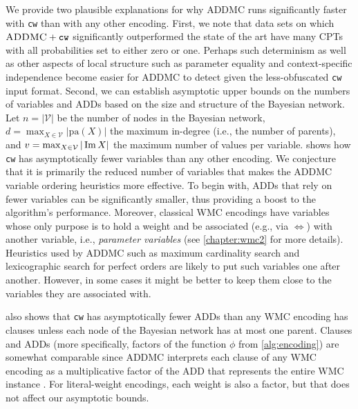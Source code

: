 We provide two plausible explanations for why \textsc{ADDMC}
\citep{DBLP:conf/aaai/DudekPV20} runs significantly faster with \texttt{cw} than
with any other encoding. First, we note that data sets on which
$\textsc{ADDMC}+\texttt{cw}$ significantly outperformed the state of the art
have many CPTs with all probabilities set to either zero or one. Perhaps such
determinism as well as other aspects of local structure such as parameter
equality and context-specific independence
\citep{DBLP:conf/uai/BoutilierFGK96,DBLP:journals/ai/VlasselaerMBR16} become
easier for \textsc{ADDMC} to detect given the less-obfuscated \texttt{cw} input
format. Second, we can establish asymptotic upper bounds on the numbers of
variables and ADDs based on the size and structure of the Bayesian network. Let
$n = |\mathcal{V}|$ be the number of nodes in the Bayesian network,
$d = \max_{X \in \mathcal{V}} |\mathrm{pa}(X)|$ the maximum in-degree (i.e., the
number of parents), and $v = \max_{X \in \mathcal{V}} |\operatorname{Im} X|$ the maximum
number of values per variable.  shows how \texttt{cw} has
asymptotically fewer variables than any other encoding. We conjecture that it is
primarily the reduced number of variables that makes the \textsc{ADDMC} variable
ordering heuristics more effective. To begin with, ADDs that rely on fewer
variables can be significantly smaller, thus providing a boost to the
algorithm's performance. Moreover, classical WMC encodings have variables whose
only purpose is to hold a weight and be associated (e.g., via $\Leftrightarrow$)
with another variable, i.e., \emph{parameter variables} (see \cref{chapter:wmc2}
for more details). Heuristics used by \textsc{ADDMC} such as maximum cardinality
search \citep{DBLP:journals/siamcomp/TarjanY84} and lexicographic search for
perfect orders \citep{DBLP:journals/siamcomp/RoseTL76} are likely to put such
variables one after another. However, in some cases it might be better to keep
them close to the variables they are associated with.

 also shows that \texttt{cw} has asymptotically fewer ADDs
than any WMC encoding has clauses unless each node of the Bayesian network has
at most one parent. Clauses and ADDs (more specifically, factors of the function
$\phi$ from \cref{alg:encoding}) are somewhat comparable since \textsc{ADDMC}
interprets each clause of any WMC encoding as a multiplicative factor of the ADD
that represents the entire WMC instance \citep{DBLP:conf/aaai/DudekPV20}. For
literal-weight encodings, each weight is also a factor, but that does not affect
our asymptotic bounds.

